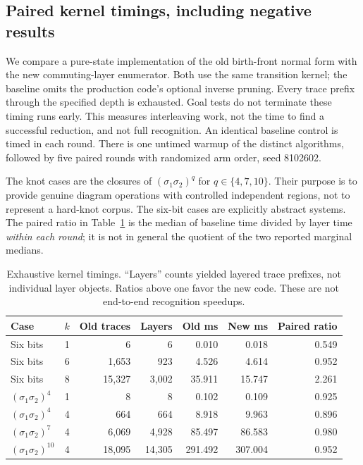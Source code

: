 \documentclass[11pt]{article}
\theoremstyle{definition}
\begin{document}
\subsection{Paired kernel timings, including negative results}

We compare a pure-state implementation of the old birth-front normal
form with the new commuting-layer enumerator. Both use the same transition
kernel; the baseline omits the production code's optional inverse pruning.
Every trace prefix through the specified depth is exhausted. Goal tests
do not terminate these timing runs early. This measures interleaving
work, not the time to find a successful reduction, and not full
recognition. An identical baseline control is timed in each round.
There is one untimed warmup of the distinct algorithms, followed by five
paired rounds with randomized arm order, seed 8102602.

The knot cases are the closures of $(\sigma_1\sigma_2)^q$ for
$q\in\{4,7,10\}$. Their purpose is to provide genuine diagram operations
with controlled independent regions, not to represent a hard-knot corpus.
The six-bit cases are explicitly abstract systems. The paired ratio in
Table~\ref{tab:bench} is the median of baseline time divided by layer time
\emph{within each round}; it is not in general the quotient of the two
reported marginal medians.

\begin{table}[htbp]
\centering\small
\begin{tabular}{lrrrrrr}
\toprule
Case & $k$ & Old traces & Layers & Old ms & New ms & Paired ratio\\
\midrule
Six bits & 1 & 6 & 6 & 0.010 & 0.018 & 0.549\\
Six bits & 6 & 1,653 & 923 & 4.526 & 4.614 & 0.952\\
Six bits & 8 & 15,327 & 3,002 & 35.911 & 15.747 & 2.261\\
$(\sigma_1\sigma_2)^4$ & 1 & 8 & 8 & 0.102 & 0.109 & 0.925\\
$(\sigma_1\sigma_2)^4$ & 4 & 664 & 664 & 8.918 & 9.963 & 0.896\\
$(\sigma_1\sigma_2)^7$ & 4 & 6,069 & 4,928 & 85.497 & 86.583 & 0.980\\
$(\sigma_1\sigma_2)^{10}$ & 4 & 18,095 & 14,305 & 291.492 & 307.004 & 0.952\\
\bottomrule
\end{tabular}
\caption{Exhaustive kernel timings. ``Layers'' counts yielded layered
trace prefixes, not individual layer objects. Ratios above one favor the
new code. These are not end-to-end recognition speedups.}
\label{tab:bench}
\end{table}
\end{document}
